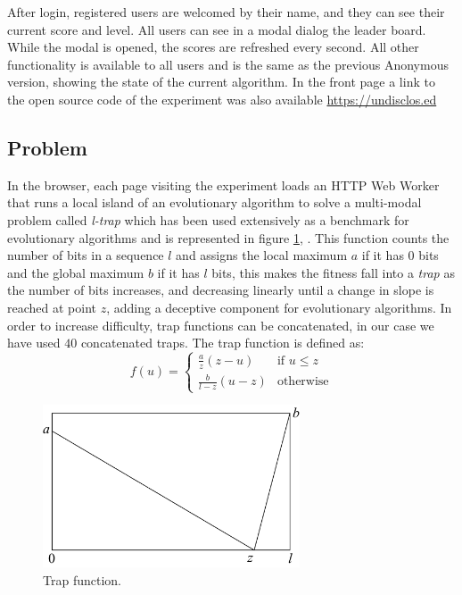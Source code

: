\documentclass{llncs}
\begin{document}
After login, registered users are welcomed by their name, and they can see
their current score and level. All users can see in a modal dialog the leader board.
While the modal is opened, the scores are refreshed every second. All other
functionality is available to all users and is the same as the previous
Anonymous version, showing the state of the current algorithm.
In the front page a link to the open source code of the experiment was also
available \url{https://undisclos.ed}


\subsection{Problem}
In the browser, each page visiting the experiment loads an HTTP Web Worker
that runs a local island of an evolutionary algorithm to solve a
multi-modal problem called {\em l-trap} which has been used extensively
as a benchmark for evolutionary algorithms and is represented in figure \ref{fig:trap},  \cite{fernandes2009using,nijssen2003analysis}.
This function counts the number of bits in a sequence $l$ and assigns
the local maximum $a$ if it has 0 bits and the global maximum $b$ if it has $l$
bits, this makes the fitness fall into a {\em trap}
as the number of bits increases, and decreasing linearly until a change in slope
is reached at point $z$, adding a deceptive component for evolutionary algorithms. In order to increase difficulty, trap functions can be concatenated, in our case we have used $40$ concatenated traps. The trap function is defined as:
\[ f(u)=
    \begin{cases}
      \frac{a}{z}(z-u) & \text{if } u\leq z\\
      \frac{b}{l-z} (u-z)& \text{otherwise}
   \end{cases}
 \]
\begin{figure}[htb]
    \centering
        \includegraphics[width=3in]{img/trap.png}
    \caption{Trap function.
    }
    \label{fig:trap}
\end{figure}
\end{document}
